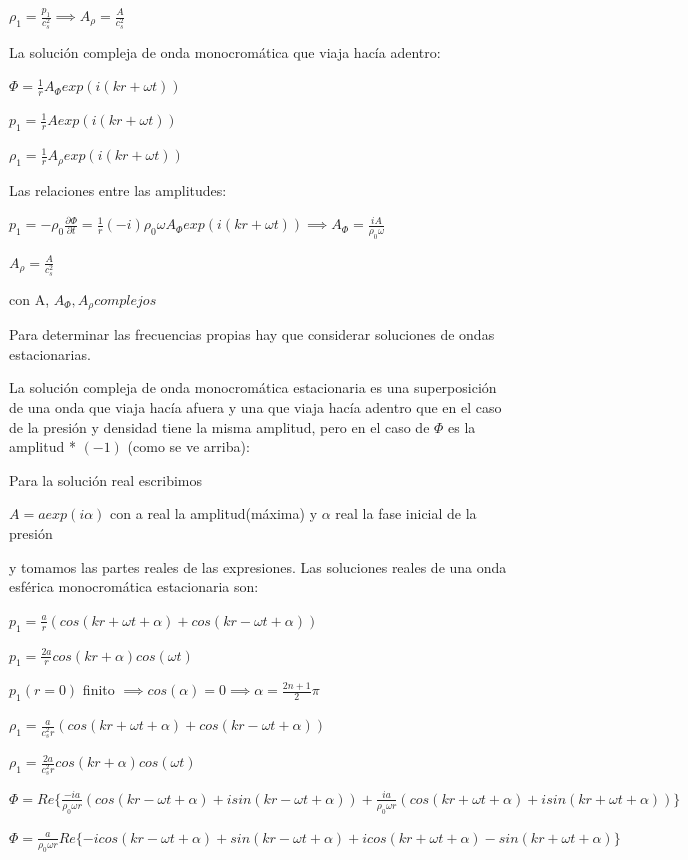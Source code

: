\documentclass[10pt]{book}
\begin{document}
$ \rho_1 = \frac{p_1}{c_s^2} \implies A_{\rho} = \frac{A}{c_s^2} $


La solución  compleja de  onda monocromática que viaja hacía adentro:

$\Phi = \frac{1}{r} A_{\Phi}exp(i(kr + \omega t)) $

$p_1 = \frac{1}{r} A exp(i(kr + \omega t)) $

$\rho_1 = \frac{1}{r} A_{\rho} exp(i(kr + \omega t)) $

Las relaciones entre las amplitudes:

$p_1 = -\rho_0 \frac{\partial \Phi}{\partial t}  = \frac{1}{r} (-i) \rho_0 \omega A_{\Phi} exp(i(kr + \omega t)) \implies A_{\Phi} = \frac{i A}{\rho_0 \omega }$

$A_{\rho} = \frac{A}{c_s^2} $

con A, $A_{\Phi}, A_{\rho} complejos$


Para determinar las frecuencias propias hay que considerar soluciones de ondas estacionarias.

La solución compleja de onda monocromática estacionaria es una superposición de una onda que viaja hacía afuera y una que viaja hacía adentro que en el caso de la presión y densidad tiene la misma amplitud, pero en el caso de $\Phi$ es la amplitud * $(-1)$ (como se ve arriba):

Para la solución real escribimos 

$A = a exp(i \alpha)$ con a real la amplitud(máxima) y $\alpha$ real la fase inicial de la presión 

y tomamos las partes reales de las expresiones. Las soluciones reales de una onda esférica monocromática estacionaria son:

$p_1 = \frac{a}{r} (cos(kr + \omega t + \alpha) + cos(kr - \omega t + \alpha)) $

$p_1 = \frac{2a}{r} cos(kr + \alpha) cos(\omega t) $

$p_1(r=0)$ finito $\implies cos(\alpha) = 0 \implies \alpha = \frac{2n+1}{2} \pi$

$\rho_1 = \frac{a}{c_s^2 r} (cos(kr + \omega t + \alpha) + cos(kr - \omega t + \alpha)) $

$\rho_1 = \frac{2 a}{c_s^2 r} cos(kr + \alpha) cos(\omega t)  $

$\Phi = Re \{ \frac{-i a}{\rho_0 \omega r}  (cos(kr - \omega t + \alpha)  + i sin(kr - \omega t + \alpha)) + \frac{i a}{\rho_0 \omega r}  (cos(kr + \omega t + \alpha)  + i sin(kr + \omega t + \alpha))   \} $

$\Phi = \frac{a}{\rho_0 \omega r} Re \{-i cos(kr - \omega t + \alpha)  +  sin(kr - \omega t + \alpha) +  i cos(kr + \omega t + \alpha)  - sin(kr + \omega t + \alpha)   \} $
\end{document}
